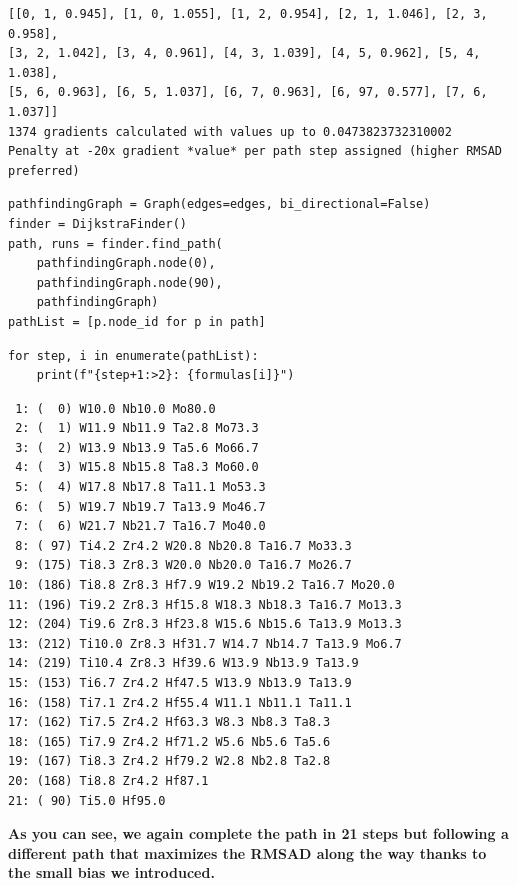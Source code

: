 \begin{verbatim}
[[0, 1, 0.945], [1, 0, 1.055], [1, 2, 0.954], [2, 1, 1.046], [2, 3, 0.958], 
[3, 2, 1.042], [3, 4, 0.961], [4, 3, 1.039], [4, 5, 0.962], [5, 4, 1.038], 
[5, 6, 0.963], [6, 5, 1.037], [6, 7, 0.963], [6, 97, 0.577], [7, 6, 1.037]]
1374 gradients calculated with values up to 0.0473823732310002
Penalty at -20x gradient *value* per path step assigned (higher RMSAD preferred)
\end{verbatim}

\begin{verbatim}
pathfindingGraph = Graph(edges=edges, bi_directional=False)
finder = DijkstraFinder()
path, runs = finder.find_path(
    pathfindingGraph.node(0), 
    pathfindingGraph.node(90), 
    pathfindingGraph)
pathList = [p.node_id for p in path]
\end{verbatim}

\begin{verbatim}
for step, i in enumerate(pathList):
    print(f"{step+1:>2}: {formulas[i]}")
\end{verbatim}

\begin{verbatim}
 1: (  0) W10.0 Nb10.0 Mo80.0 
 2: (  1) W11.9 Nb11.9 Ta2.8 Mo73.3 
 3: (  2) W13.9 Nb13.9 Ta5.6 Mo66.7 
 4: (  3) W15.8 Nb15.8 Ta8.3 Mo60.0 
 5: (  4) W17.8 Nb17.8 Ta11.1 Mo53.3 
 6: (  5) W19.7 Nb19.7 Ta13.9 Mo46.7 
 7: (  6) W21.7 Nb21.7 Ta16.7 Mo40.0 
 8: ( 97) Ti4.2 Zr4.2 W20.8 Nb20.8 Ta16.7 Mo33.3 
 9: (175) Ti8.3 Zr8.3 W20.0 Nb20.0 Ta16.7 Mo26.7 
10: (186) Ti8.8 Zr8.3 Hf7.9 W19.2 Nb19.2 Ta16.7 Mo20.0 
11: (196) Ti9.2 Zr8.3 Hf15.8 W18.3 Nb18.3 Ta16.7 Mo13.3 
12: (204) Ti9.6 Zr8.3 Hf23.8 W15.6 Nb15.6 Ta13.9 Mo13.3 
13: (212) Ti10.0 Zr8.3 Hf31.7 W14.7 Nb14.7 Ta13.9 Mo6.7 
14: (219) Ti10.4 Zr8.3 Hf39.6 W13.9 Nb13.9 Ta13.9 
15: (153) Ti6.7 Zr4.2 Hf47.5 W13.9 Nb13.9 Ta13.9 
16: (158) Ti7.1 Zr4.2 Hf55.4 W11.1 Nb11.1 Ta11.1 
17: (162) Ti7.5 Zr4.2 Hf63.3 W8.3 Nb8.3 Ta8.3 
18: (165) Ti7.9 Zr4.2 Hf71.2 W5.6 Nb5.6 Ta5.6 
19: (167) Ti8.3 Zr4.2 Hf79.2 W2.8 Nb2.8 Ta2.8 
20: (168) Ti8.8 Zr4.2 Hf87.1 
21: ( 90) Ti5.0 Hf95.0 
\end{verbatim}

\textbf{As you can see, we again complete the path in 21 steps but
following a different path that maximizes the RMSAD along the way thanks
to the small bias we introduced.}


